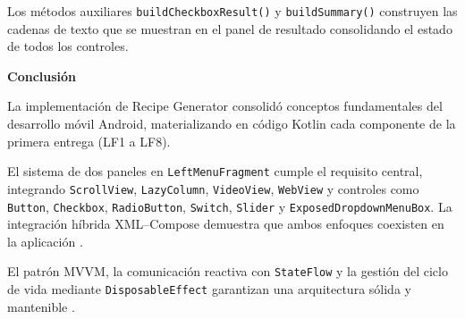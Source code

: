 \documentclass[stu, 12pt, letterpaper, donotrepeattitle, floatsintext, natbib]{apa7}
\begin{document}
Los métodos auxiliares \texttt{buildCheckboxResult()} y \texttt{buildSummary()} construyen
las cadenas de texto que se muestran en el panel de resultado consolidando el estado de
todos los controles.

\newpage
\begin{center}
\textbf{\large Conclusión}
\end{center}

{\normalsize\setlength{\parskip}{6pt}\setlength{\parindent}{10pt}

La implementación de Recipe Generator consolidó conceptos fundamentales del desarrollo móvil Android, materializando en código Kotlin cada componente de la primera entrega (LF1 a LF8).

El sistema de dos paneles en \texttt{LeftMenuFragment} cumple el requisito central, integrando \texttt{ScrollView}, \texttt{LazyColumn}, \texttt{VideoView}, \texttt{WebView} y controles como \texttt{Button}, \texttt{Checkbox}, \texttt{RadioButton}, \texttt{Switch}, \texttt{Slider} y \texttt{ExposedDropdownMenuBox}. La integración híbrida XML--Compose demuestra que ambos enfoques coexisten en la aplicación \citep{androiddevelopers2024fragments}.

El patrón MVVM, la comunicación reactiva con \texttt{StateFlow} y la gestión del ciclo de vida mediante \texttt{DisposableEffect} garantizan una arquitectura sólida y mantenible \citep{girones2013, smyth2017}.
}
\end{document}
